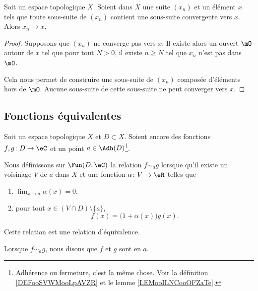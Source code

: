 \begin{lemma}        \label{LEMooSJKMooKSiEGq}
    Soit un espace topologique \( X\). Soient dans \( X\) une suite \( (x_n)\) et un élément \( x\) tels que toute sous-suite de \( (x_n)\) contient une sous-suite convergente vers \( x\). Alors \( x_n\to x\).
\end{lemma}

\begin{proof}
    Supposons que \( (x_n)\) ne converge pas vers \( x\). Il existe alors un ouvert \( \mO\) autour de \( x\) tel que pour tout \( N>0\), il existe \( n\geq N\) tel que \( x_n\) n'est pas dans \( \mO\).

    Cela nous permet de construire une sous-suite de \( (x_n)\) composée d'éléments hors de \( \mO\). Aucune sous-suite de cette sous-suite ne peut converger vers \( x\).
\end{proof}

\subsection{Fonctions équivalentes}

\begin{propositionDef}       \label{DEFooWDSAooKXZsZY}
    Soit un espace topologique \( X\) et \( D\subset X\). Soient encore des fonctions \( f,g\colon D\to \eC\) et un point \( a\in\Adh(D)\)\footnote{Adhérence ou fermeture, c'est la même chose. Voir la définition \ref{DEFooSVWMooLpAVZR} et le lemme \ref{LEMooILNCooOFZaTe}.}.

    Nous définissons sur \( \Fun(D,\eC)\) la relation \( f\sim_ag\) lorsque qu'il existe un voisinage \( V\) de \( a\) dans \( X\) et une fonction \( \alpha\colon V\to \eR\) telles que
    \begin{enumerate}
        \item
            \( \lim_{x\to a} \alpha(x)=0\),
        \item
            pour tout \( x\in (V\cap D)\setminus\{ a \}\), 
            \begin{equation}        \label{EQooQXKYooSDPpNq}
                f(x)=\big( 1+\alpha(x) \big)g(x).
            \end{equation}
    \end{enumerate}
    Cette relation est une relation d'équivalence.

    Lorsque \( f\sim_a g\), nous disons que \( f\) et \( g\) sont  en \( a\).
\end{propositionDef}

